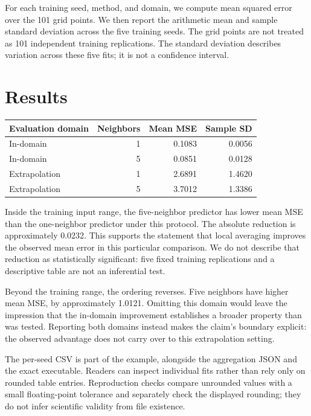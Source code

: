 \documentclass[
  10pt,
  letterpaper,
]{article}
\newcounter{none} %
\begin{document}
For each training seed, method, and domain, we compute mean squared
error over the 101 grid points. We then report the arithmetic mean and
sample standard deviation across the five training seeds. The grid
points are not treated as 101 independent training replications. The
standard deviation describes variation across these five fits; it is not
a confidence interval.

\section{Results}\label{results}

{\def\LTcaptype{none} %
\begin{longtable}[]{@{}lrrr@{}}
\toprule\noalign{}
Evaluation domain & Neighbors & Mean MSE & Sample SD \\
\midrule\noalign{}
\endhead
\bottomrule\noalign{}
\endlastfoot
In-domain & 1 & 0.1083 & 0.0056 \\
In-domain & 5 & 0.0851 & 0.0128 \\
Extrapolation & 1 & 2.6891 & 1.4620 \\
Extrapolation & 5 & 3.7012 & 1.3386 \\
\end{longtable}
}

Inside the training input range, the five-neighbor predictor has lower
mean MSE than the one-neighbor predictor under this protocol. The
absolute reduction is approximately 0.0232. This supports the statement
that local averaging improves the observed mean error in this particular
comparison. We do not describe that reduction as statistically
significant: five fixed training replications and a descriptive table
are not an inferential test.

Beyond the training range, the ordering reverses. Five neighbors have
higher mean MSE, by approximately 1.0121. Omitting this domain would
leave the impression that the in-domain improvement establishes a
broader property than was tested. Reporting both domains instead makes
the claim's boundary explicit: the observed advantage does not carry
over to this extrapolation setting.

The per-seed CSV is part of the example, alongside the aggregation JSON
and the exact executable. Readers can inspect individual fits rather
than rely only on rounded table entries. Reproduction checks compare
unrounded values with a small floating-point tolerance and separately
check the displayed rounding; they do not infer scientific validity from
file existence.
\end{document}
